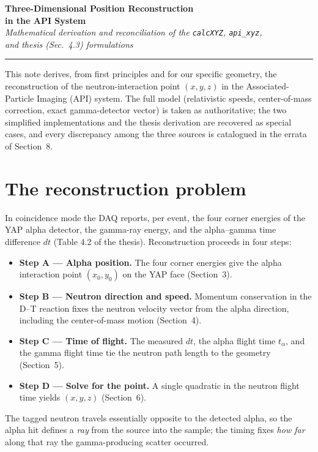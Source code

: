 \documentclass[11pt]{article}
\newcommand{\code}[1]{\texttt{\small #1}}
\newcommand{\dt}{\mathit{dt}}
\begin{document}
\begin{center}
  {\LARGE\bfseries Three-Dimensional Position Reconstruction\\[2pt]
   in the API System}\\[10pt]
  {\large\itshape Mathematical derivation and reconciliation of the
   \code{calcXYZ}, \code{api\_xyz},\\ and thesis (Sec.~4.3) formulations}\\[6pt]
  {\color{gray}\rule{0.6\textwidth}{0.4pt}}
\end{center}

\vspace{0.4em}
\noindent
This note derives, from first principles and for our specific geometry, the
reconstruction of the neutron-interaction point $(x,y,z)$ in the
Associated-Particle Imaging (API) system. The full model (relativistic speeds,
center-of-mass correction, exact gamma-detector vector) is taken as
authoritative; the two simplified implementations and the thesis derivation are
recovered as special cases, and every discrepancy among the three sources is
catalogued in the errata of Section~8.

\section{The reconstruction problem}
In coincidence mode the DAQ reports, per event, the four corner energies of the
YAP alpha detector, the gamma-ray energy, and the alpha--gamma time difference
$\dt$ (Table 4.2 of the thesis). Reconstruction proceeds in four steps:
\begin{itemize}[leftmargin=1.4em,itemsep=2pt]
  \item \textbf{Step A --- Alpha position.} The four corner energies give the
        alpha interaction point $(x_0,y_0)$ on the YAP face (Section~3).
  \item \textbf{Step B --- Neutron direction and speed.} Momentum conservation
        in the D--T reaction fixes the neutron velocity vector from the alpha
        direction, including the center-of-mass motion (Section~4).
  \item \textbf{Step C --- Time of flight.} The measured $\dt$, the alpha flight
        time $t_\alpha$, and the gamma flight time tie the neutron path length to
        the geometry (Section~5).
  \item \textbf{Step D --- Solve for the point.} A single quadratic in the
        neutron flight time yields $(x,y,z)$ (Section~6).
\end{itemize}
The tagged neutron travels essentially opposite to the detected alpha, so the
alpha hit defines a \emph{ray} from the source into the sample; the timing fixes
\emph{how far} along that ray the gamma-producing scatter occurred.
\end{document}
